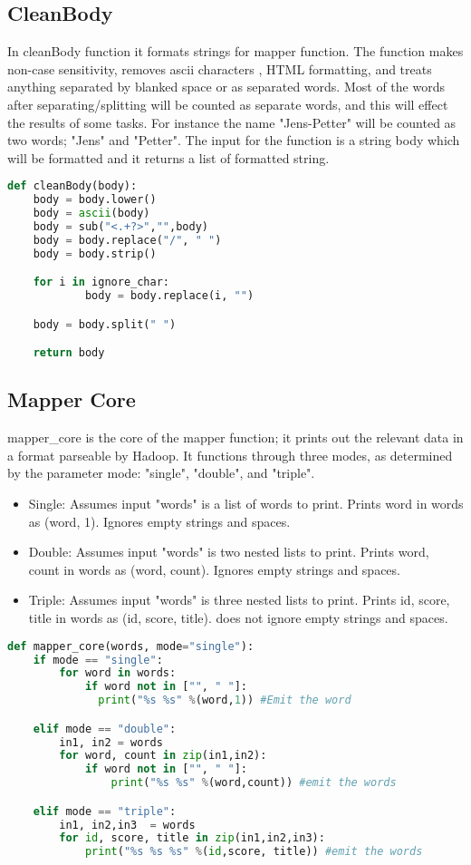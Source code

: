 \documentclass[fleqn,10pt]{wlscirep}
\begin{document}
\subsection{CleanBody}

In cleanBody function it formats strings for mapper function. The function makes non-case sensitivity, removes ascii characters , HTML formatting, and treats anything separated by blanked space or as separated words. Most of the words after separating/splitting will be counted as separate words, and this will effect the results of some tasks. For instance  the name "Jens-Petter" will be counted as two words; "Jens" and "Petter". The input for the function is a string body which will be formatted and it returns a list of formatted string.

\begin{lstlisting}[language=Python, caption=cleanBody function]
def cleanBody(body):
    body = body.lower()
    body = ascii(body)
    body = sub("<.+?>","",body)
    body = body.replace("/", " ")
    body = body.strip()

    for i in ignore_char:
        	body = body.replace(i, "")

    body = body.split(" ")

    return body
\end{lstlisting}
\subsection{Mapper Core}
mapper\_core is the core of the mapper function; it prints out the relevant data in a format parseable by Hadoop. It functions through three modes, as determined by the parameter mode: "single", "double", and "triple".

\begin{itemize}
  \item Single: Assumes input "words" is a list of words to print. Prints word in words as (word, 1). Ignores empty strings and spaces.
  \item Double: Assumes input "words" is two nested lists to print. Prints word, count in words as (word, count). Ignores empty strings and spaces.
  \item Triple: Assumes input "words" is three nested lists to print. Prints id, score, title in words as (id, score, title). does not ignore empty strings and spaces.
\end{itemize}

\begin{lstlisting}[language=Python, caption=mapper\_core function]
def mapper_core(words, mode="single"):
    if mode == "single":
        for word in words:
            if word not in ["", " "]:
              print("%s %s" %(word,1)) #Emit the word

    elif mode == "double":
        in1, in2 = words
        for word, count in zip(in1,in2):
            if word not in ["", " "]:
                print("%s %s" %(word,count)) #emit the words

    elif mode == "triple":
        in1, in2,in3  = words
        for id, score, title in zip(in1,in2,in3):
            print("%s %s %s" %(id,score, title)) #emit the words


\end{lstlisting}
\end{document}
